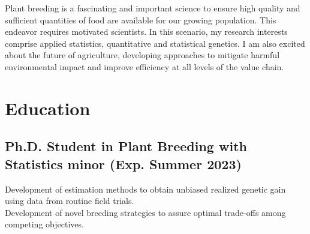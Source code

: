 \documentclass[]{mdkrause_cv_openfont}
\begin{document}
%
%

%
%

%
%

\begin{minipage}[t]{1\textwidth} 

\sectionsep

Plant breeding is a fascinating and important science to ensure high quality and sufficient quantities of food are available for our growing population. This endeavor requires motivated scientists. In this scenario, my research interests comprise applied statistics, quantitative and statistical genetics. I am also excited about the future of agriculture, developing approaches to mitigate harmful environmental impact and improve efficiency at all levels of the value chain.

\sectionsep


\section{Education} 

\sectionsep

\subsection{Ph.D. Student in Plant Breeding with Statistics minor (Exp. Summer 2023)}
 Development of
estimation methods to obtain unbiased realized genetic gain using data from routine field trials. \\ 
\hspace{1.55 cm} Development of novel breeding strategies to assure optimal trade-offs among
competing objectives.

\sectionsep
\vspace{0.2 mm}


\end{minipage}
\end{document}
